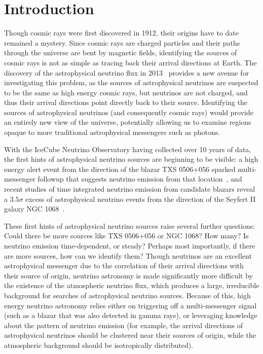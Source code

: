 \chapter{Introduction}\label{chapter:introduction}

Though cosmic rays were first discovered in 1912, their origins have to date remained a mystery. Since cosmic rays are charged particles and their paths through the universe are bent by magnetic fields, identifying the sources of cosmic rays is not as simple as tracing back their arrival directions at Earth. The discovery of the astrophysical neutrino flux in 2013~\cite{astroneutrinos} provides a new avenue for investigating this problem, as the sources of astrophysical neutrinos are suspected to be the same as high energy cosmic rays, but neutrinos are not charged, and thus their arrival directions point directly back to their source. Identifying the sources of astrophysical neutrinos (and consequently cosmic rays) would provide an entirely new view of the universe, potentially allowing us to examine regions opaque to more traditional astrophysical messengers such as photons. 

With the IceCube Neutrino Observatory having collected over 10 years of data, the first hints of astrophysical neutrino sources are beginning to be visible: a high energy alert event from the direction of the blazar TXS 0506+056 sparked multi-messenger followup that suggests neutrino emission from that location~\cite{TXS_Multimessenger}\cite{TXS_Archival}, and recent studies of time integrated neutrino emission from candidate blazars reveal a $3.5 \sigma$ excess of astrophysical neutrino events from the direction of the Seyfert II galaxy NGC 1068~\cite{10yr_tint}. 

These first hints of astrophysical neutrino sources raise several further questions: Could there be more sources like TXS 0506+056 or NGC 1068? How many? Is neutrino emission time-dependent, or steady? Perhaps most importantly, if there are more sources, how can we identify them? Though neutrinos are an excellent astrophysical messenger due to the correlation of their arrival directions with their source of origin, neutrino astronomy is made significantly more difficult by the existence of the atmospheric neutrino flux, which produces a large, irreducible background for searches of astrophysical neutrino sources. Because of this, high energy neutrino astronomy relies either on triggering off a multi-messenger signal (such as a blazar that was also detected in gamma rays), or leveraging knowledge about the pattern of neutrino emission (for example, the arrival directions of astrophysical neutrinos should be clustered near their sources of origin, while the atmospheric background should be isotropically distributed). 

